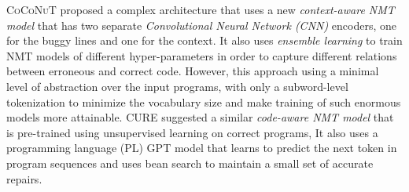 %
\textsc{CoCoNuT} \citep{Lutellier2020} proposed a complex architecture that uses
a new \emph{context-aware NMT model} that has two separate \emph{Convolutional
Neural Network (CNN)} encoders, one for the buggy lines and one for the context.
It also uses \emph{ensemble learning} to train NMT models of different
hyper-parameters in order to capture different relations between erroneous and
correct code. However, this approach using a minimal level of abstraction over
the input programs, with only a subword-level tokenization to minimize the
vocabulary size and make training of such enormous models more attainable.
\textsc{CURE} \citep{Jiang_2021} suggested a similar \emph{code-aware NMT model}
that is pre-trained using unsupervised learning on correct programs, It also
uses a programming language (PL) \textsc{GPT} \citep{GPT2020} model that learns
to predict the next token in program sequences and uses bean search to maintain
a small set of accurate repairs.
